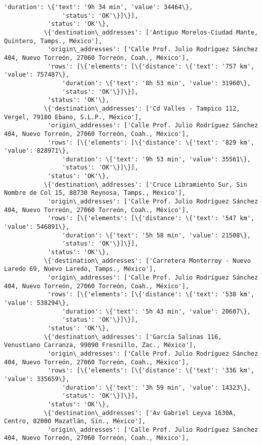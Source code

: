 \documentclass[11pt]{article}
\begin{document}
\begin{Verbatim}[commandchars=\\\{\}]
                'duration': \{'text': '9h 34 min', 'value': 34464\},
                'status': 'OK'\}]\}],
            'status': 'OK'\},
           \{'destination\_addresses': ['Antiguo Morelos-Ciudad Mante, Quintero, Tamps., México'],
            'origin\_addresses': ['Calle Prof. Julio Rodríguez Sánchez 404, Nuevo Torreón, 27060 Torreón, Coah., México'],
            'rows': [\{'elements': [\{'distance': \{'text': '757 km', 'value': 757487\},
                'duration': \{'text': '8h 53 min', 'value': 31960\},
                'status': 'OK'\}]\}],
            'status': 'OK'\},
           \{'destination\_addresses': ['Cd Valles - Tampico 112, Vergel, 79180 Ebano, S.L.P., México'],
            'origin\_addresses': ['Calle Prof. Julio Rodríguez Sánchez 404, Nuevo Torreón, 27060 Torreón, Coah., México'],
            'rows': [\{'elements': [\{'distance': \{'text': '829 km', 'value': 828971\},
                'duration': \{'text': '9h 53 min', 'value': 35561\},
                'status': 'OK'\}]\}],
            'status': 'OK'\},
           \{'destination\_addresses': ['Cruce Libramiento Sur, Sin Nombre de Col 15, 88730 Reynosa, Tamps., México'],
            'origin\_addresses': ['Calle Prof. Julio Rodríguez Sánchez 404, Nuevo Torreón, 27060 Torreón, Coah., México'],
            'rows': [\{'elements': [\{'distance': \{'text': '547 km', 'value': 546891\},
                'duration': \{'text': '5h 58 min', 'value': 21508\},
                'status': 'OK'\}]\}],
            'status': 'OK'\},
           \{'destination\_addresses': ['Carretera Monterrey - Nuevo Laredo 69, Nuevo Laredo, Tamps., México'],
            'origin\_addresses': ['Calle Prof. Julio Rodríguez Sánchez 404, Nuevo Torreón, 27060 Torreón, Coah., México'],
            'rows': [\{'elements': [\{'distance': \{'text': '538 km', 'value': 538294\},
                'duration': \{'text': '5h 43 min', 'value': 20607\},
                'status': 'OK'\}]\}],
            'status': 'OK'\},
           \{'destination\_addresses': ['García Salinas 116, Venustiano Carranza, 99090 Fresnillo, Zac., México'],
            'origin\_addresses': ['Calle Prof. Julio Rodríguez Sánchez 404, Nuevo Torreón, 27060 Torreón, Coah., México'],
            'rows': [\{'elements': [\{'distance': \{'text': '336 km', 'value': 335659\},
                'duration': \{'text': '3h 59 min', 'value': 14323\},
                'status': 'OK'\}]\}],
            'status': 'OK'\},
           \{'destination\_addresses': ['Av Gabriel Leyva 1630A, Centro, 82000 Mazatlán, Sin., México'],
            'origin\_addresses': ['Calle Prof. Julio Rodríguez Sánchez 404, Nuevo Torreón, 27060 Torreón, Coah., México'],

\end{Verbatim}
\end{document}
